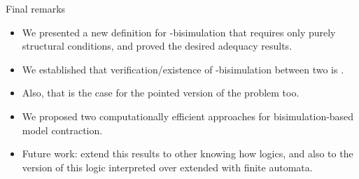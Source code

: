 \documentclass{beamer}
\begin{document}
\begin{frame}
    {Final remarks}

    \begin{small}
        \begin{itemize}
            \item We presented a new definition for \KHilogic-bisimulation that requires only purely structural conditions, and proved the desired adequacy results. \pause
            \item We established that verification/existence of \KHilogic-bisimulation between two \ultss is \coNPComplete. \pause
            \item Also, that is the case for the pointed version of the problem too. \pause
            \item We proposed two computationally efficient approaches for bisimulation-based model contraction. \pause
            \item Future work: extend this results to other knowing how logics, and also to the version of this logic interpreted 
            over \ults extended with finite automata.
        \end{itemize}
    \end{small}
\end{frame}

\end{document}
